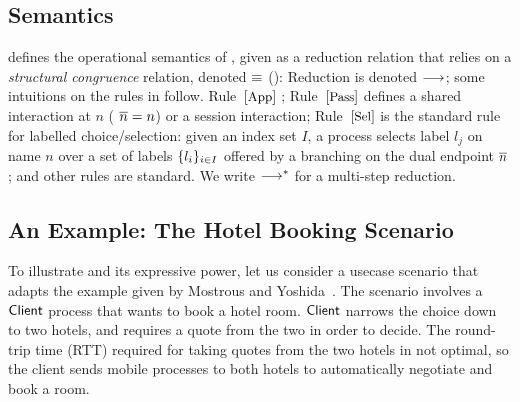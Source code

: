 \smallskip

\subsection{Semantics}
	  defines the operational semantics 
of \HOp, given as
a reduction relation that relies 
on 
a \emph{structural congruence} relation, denoted $\equiv$ (): %
Reduction is denoted $\longrightarrow$; some intuitions on the rules in  %
follow.
Rule~${{[\textrm{\small App}]}}$ ; 
Rule~${{[\textrm{\small Pass}]}}$ defines a shared interaction at $n$ 
( $\overline{n}=n$) or a session interaction;  
Rule~${{[\textrm{\small Sel}]}}$ is the standard rule for labelled choice/selection:
given an index set $I$, 
a process selects label $l_j$ on name $n$ over a set of
labels $\{l_i\}_{i \in I}$ offered by a branching 
on the dual endpoint $\overline{n}$; and other rules are standard.
We write $\longrightarrow^\ast$ for a multi-step reduction. 


\subsection{An Example: The Hotel Booking Scenario}\label{exam:proc}
To illustrate \HOp and its expressive power, 
let us consider a usecase scenario that adapts the example given by Mostrous and Yoshida~\cite{tlca07,MostrousY15}.
The scenario involves a $\mathsf{Client}$ process that wants to book
a hotel room. %
$\mathsf{Client}$
narrows the choice down to two hotels, and requires 
 a quote from the two in order to
decide. The round-trip time (RTT) required for
taking quotes from the two hotels in not optimal, %
so the client sends mobile processes to both hotels
to automatically negotiate and book a room. 

